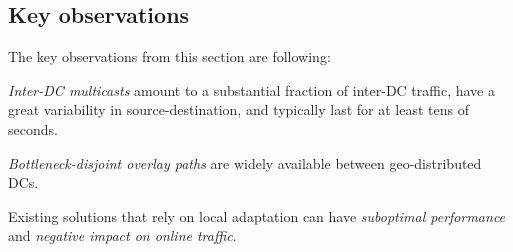 

\subsection{Key observations}
\label{subsec:motivation:observation}
The key observations from this section are following:
\begin{packeditemize}
\item {\em Inter-DC multicasts} amount to a substantial fraction of
inter-DC traffic, have a great variability in source-destination, and
typically last for at least tens of seconds.
\item {\em Bottleneck-disjoint overlay paths} are widely available
between geo-distributed DCs.
\item Existing solutions that rely on local adaptation can have
{\em suboptimal performance} and {\em negative impact on
online traffic}.
\end{packeditemize}




